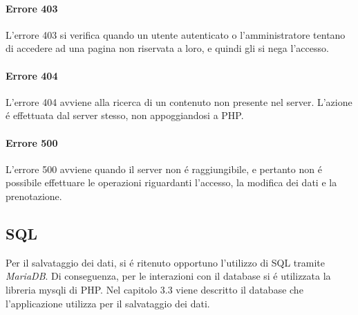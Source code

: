 \documentclass{article}
\begin{document}
\paragraph*{Errore 403}
L'errore 403 si verifica quando un utente autenticato o l'amministratore tentano di accedere ad una pagina non riservata a loro, e quindi gli si nega l'accesso.
\paragraph*{Errore 404}
L'errore 404 avviene alla ricerca di un contenuto non presente nel server. L'azione é effettuata dal server stesso, non appoggiandosi a PHP.
\paragraph*{Errore 500}
L'errore 500 avviene quando il server non é raggiungibile, e pertanto non é possibile effettuare le operazioni riguardanti l'accesso, la modifica dei dati e la prenotazione.
\subsection{SQL}	%
Per il salvataggio dei dati, si é ritenuto opportuno l'utilizzo di SQL tramite \textit{MariaDB}.
Di conseguenza, per le interazioni con il database si é utilizzata la libreria mysqli di PHP.
Nel capitolo 3.3 viene descritto il database che l'applicazione utilizza per il salvataggio dei dati.
\end{document}
